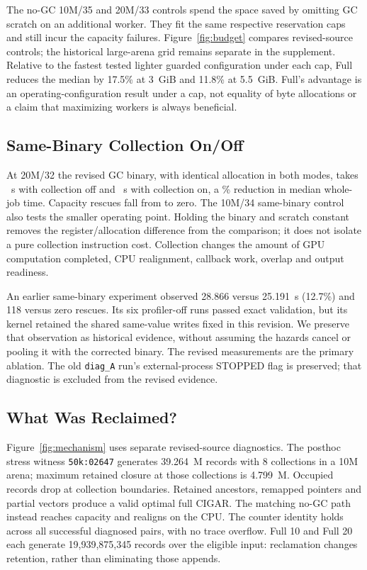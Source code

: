 \documentclass[conference,a4paper]{IEEEtran}
\begin{document}
The no-GC 10M/35 and 20M/33 controls spend the space saved by omitting GC scratch on an additional worker. They fit the same respective reservation caps and still incur the capacity failures. Figure~\ref{fig:budget} compares revised-source controls; the historical large-arena grid remains separate in the supplement. Relative to the fastest tested lighter guarded configuration under each cap, Full reduces the median by 17.5\% at 3~GiB and 11.8\% at 5.5~GiB. Full's advantage is an operating-configuration result under a cap, not equality of byte allocations or a claim that maximizing workers is always beneficial.


\subsection{Same-Binary Collection On/Off}
At 20M/32 the revised GC binary, with identical allocation in both modes, takes \OffTwenty{}~s with collection off and \FullTwenty{}~s with collection on, a \ModeReductionTwenty{}\% reduction in median whole-job time. Capacity rescues fall from \RescueTwenty{} to zero. The 10M/34 same-binary control also tests the smaller operating point. Holding the binary and scratch constant removes the register/allocation difference from the comparison; it does not isolate a pure collection instruction cost. Collection changes the amount of GPU computation completed, CPU realignment, callback work, overlap and output readiness.

An earlier same-binary experiment observed 28.866 versus 25.191~s (12.7\%) and 118 versus zero rescues. Its six profiler-off runs passed exact validation, but its kernel retained the shared same-value writes fixed in this revision. We preserve that observation as historical evidence, without assuming the hazards cancel or pooling it with the corrected binary. The revised measurements are the primary ablation. The old \texttt{diag\_A} run's external-process STOPPED flag is preserved; that diagnostic is excluded from the revised evidence.

\subsection{What Was Reclaimed?}
Figure~\ref{fig:mechanism} uses separate revised-source diagnostics. The posthoc stress witness \texttt{50k:02647} generates 39.264~M records with 8 collections in a 10M arena; maximum retained closure at those collections is 4.799~M. Occupied records drop at collection boundaries. Retained ancestors, remapped pointers and partial vectors produce a valid optimal full CIGAR. The matching no-GC path instead reaches capacity and realigns on the CPU. The counter identity holds across all successful diagnosed pairs, with no trace overflow. Full 10 and Full 20 each generate 19,939,875,345 records over the eligible input: reclamation changes retention, rather than eliminating those appends.
\end{document}
